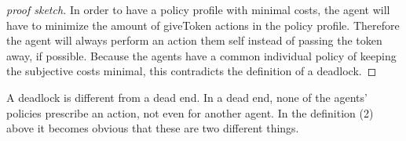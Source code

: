 \begin{proof}[proof sketch]
  In order to have a policy profile with minimal costs, the agent will have to minimize the amount of giveToken actions in the policy profile. Therefore the agent will always perform an action them self instead of passing the token away, if possible. Because the agents have a common individual policy of keeping the subjective costs minimal, this contradicts the definition of a deadlock.
\end{proof}


A deadlock is different from a dead end. In a dead end, none of the agents' policies prescribe an action, not even for another agent. In the definition (2) above it becomes obvious that these are two different things. 
